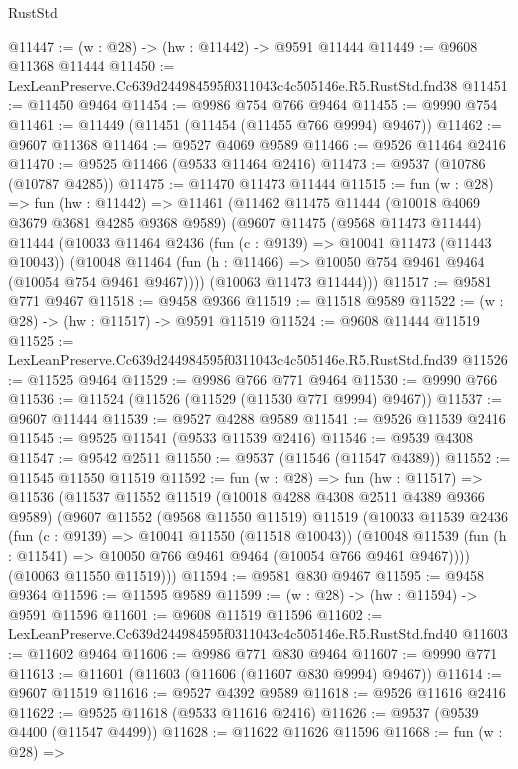 \begin{lexlean}{RustStd}
\begin{coremodule}
@11447 := (w : @28) -> (hw : @11442) -> @9591 @11444
@11449 := @9608 @11368 @11444
@11450 := LexLeanPreserve.Cc639d244984595f0311043c4c505146e.R5.RustStd.fnd38
@11451 := @11450 @9464
@11454 := @9986 @754 @766 @9464
@11455 := @9990 @754
@11461 := @11449 (@11451 (@11454 (@11455 @766 @9994) @9467))
@11462 := @9607 @11368
@11464 := @9527 @4069 @9589
@11466 := @9526 @11464 @2416
@11470 := @9525 @11466 (@9533 @11464 @2416)
@11473 := @9537 (@10786 (@10787 @4285))
@11475 := @11470 @11473 @11444
@11515 := fun (w : @28) =>
  fun (hw : @11442) =>
  @11461
    (@11462
      @11475
      @11444
      (@10018 @4069 @3679 @3681 @4285 @9368 @9589)
      (@9607
        @11475
        (@9568 @11473 @11444)
        @11444
        (@10033
          @11464
          @2436
          (fun (c : @9139) => @10041 @11473 (@11443 @10043))
          (@10048 @11464 (fun (h : @11466) => @10050 @754 @9461 @9464 (@10054 @754 @9461 @9467))))
        (@10063 @11473 @11444)))
@11517 := @9581 @771 @9467
@11518 := @9458 @9366
@11519 := @11518 @9589
@11522 := (w : @28) -> (hw : @11517) -> @9591 @11519
@11524 := @9608 @11444 @11519
@11525 := LexLeanPreserve.Cc639d244984595f0311043c4c505146e.R5.RustStd.fnd39
@11526 := @11525 @9464
@11529 := @9986 @766 @771 @9464
@11530 := @9990 @766
@11536 := @11524 (@11526 (@11529 (@11530 @771 @9994) @9467))
@11537 := @9607 @11444
@11539 := @9527 @4288 @9589
@11541 := @9526 @11539 @2416
@11545 := @9525 @11541 (@9533 @11539 @2416)
@11546 := @9539 @4308
@11547 := @9542 @2511
@11550 := @9537 (@11546 (@11547 @4389))
@11552 := @11545 @11550 @11519
@11592 := fun (w : @28) =>
  fun (hw : @11517) =>
  @11536
    (@11537
      @11552
      @11519
      (@10018 @4288 @4308 @2511 @4389 @9366 @9589)
      (@9607
        @11552
        (@9568 @11550 @11519)
        @11519
        (@10033
          @11539
          @2436
          (fun (c : @9139) => @10041 @11550 (@11518 @10043))
          (@10048 @11539 (fun (h : @11541) => @10050 @766 @9461 @9464 (@10054 @766 @9461 @9467))))
        (@10063 @11550 @11519)))
@11594 := @9581 @830 @9467
@11595 := @9458 @9364
@11596 := @11595 @9589
@11599 := (w : @28) -> (hw : @11594) -> @9591 @11596
@11601 := @9608 @11519 @11596
@11602 := LexLeanPreserve.Cc639d244984595f0311043c4c505146e.R5.RustStd.fnd40
@11603 := @11602 @9464
@11606 := @9986 @771 @830 @9464
@11607 := @9990 @771
@11613 := @11601 (@11603 (@11606 (@11607 @830 @9994) @9467))
@11614 := @9607 @11519
@11616 := @9527 @4392 @9589
@11618 := @9526 @11616 @2416
@11622 := @9525 @11618 (@9533 @11616 @2416)
@11626 := @9537 (@9539 @4400 (@11547 @4499))
@11628 := @11622 @11626 @11596
@11668 := fun (w : @28) =>

\end{coremodule}
\end{lexlean}
